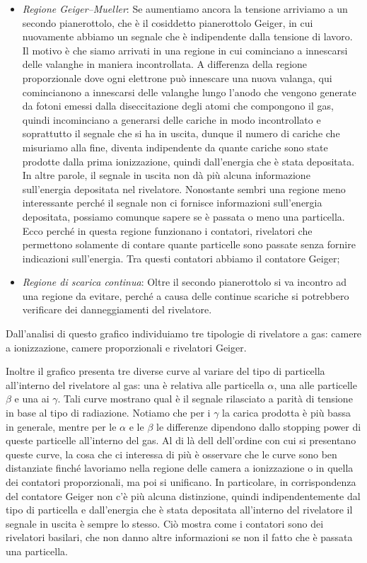 \begin{itemize}[leftmargin=0.5cm]
   \item \textit{Regione Geiger--Mueller}: Se aumentiamo ancora la tensione arriviamo a un secondo pianerottolo, che è il cosiddetto pianerottolo Geiger, in cui nuovamente abbiamo un segnale che è indipendente dalla tensione di lavoro. Il motivo è che siamo arrivati in una regione in cui cominciano a innescarsi delle valanghe in maniera incontrollata. A differenza della regione proporzionale dove ogni elettrone può innescare una nuova valanga, qui comincianono a innescarsi delle valanghe lungo l'anodo che vengono generate da fotoni emessi dalla diseccitazione degli atomi che compongono il gas, quindi incominciano a generarsi delle cariche in modo incontrollato e soprattutto il segnale che si ha in uscita, dunque il numero di cariche che misuriamo alla fine, diventa indipendente da quante cariche sono state prodotte dalla prima ionizzazione, quindi dall'energia che è stata depositata. In altre parole, il segnale in uscita non dà più alcuna informazione sull'energia depositata nel rivelatore. Nonostante sembri una regione meno interessante perché il segnale non ci fornisce informazioni sull'energia depositata, possiamo comunque sapere se è passata o meno una particella. Ecco perché in questa regione funzionano i contatori, rivelatori che permettono solamente di contare quante particelle sono passate senza fornire indicazioni sull'energia. Tra questi contatori abbiamo il contatore Geiger;
   \item \textit{Regione di scarica continua}: Oltre il secondo pianerottolo si va incontro ad una regione da evitare, perché a causa delle continue scariche si potrebbero verificare dei danneggiamenti del rivelatore.
\end{itemize}

Dall'analisi di questo grafico individuiamo tre tipologie di rivelatore a gas: camere a ionizzazione, camere proporzionali e rivelatori Geiger.

Inoltre il grafico presenta tre diverse curve al variare del tipo di particella all'interno del rivelatore al gas: una è relativa alle particella $\alpha$, una alle particelle $\beta$ e una ai $\gamma$. Tali curve mostrano qual è il segnale rilasciato a parità di tensione in base al tipo di radiazione. Notiamo che per i $\gamma$ la carica prodotta è più bassa in generale, mentre per le $\alpha$ e le $\beta$ le differenze dipendono dallo stopping power di queste particelle all'interno del gas. Al di là dell dell'ordine con cui si presentano queste curve, la cosa che ci interessa di più è osservare che le curve sono ben distanziate finché lavoriamo nella regione delle camera a ionizzazione o in quella dei contatori proporzionali, ma poi si unificano. In particolare, in corrispondenza del contatore Geiger non c'è più alcuna distinzione, quindi indipendentemente dal tipo di particella e dall'energia che è stata depositata all'interno del rivelatore il segnale in uscita è sempre lo stesso. Ciò mostra come i contatori sono dei rivelatori basilari, che non danno altre informazioni se non il fatto che è passata una particella.

